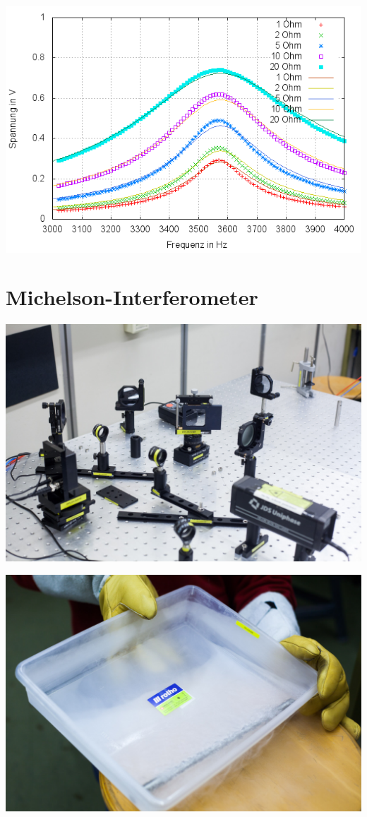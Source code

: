 \documentclass[compress,11pt]{beamer}
\begin{document}
\begin{frame}
	\includegraphics[width=\textwidth]{images/1/plot}
\end{frame}


\section{Michelson-Interferometer}
\begin{frame}
	\includegraphics[width=\textwidth]{images/2/interferrometer-4}
\end{frame}

\begin{frame}
	\includegraphics[width=\textwidth]{images/2/interferrometer-1}
\end{frame}
\end{document}
